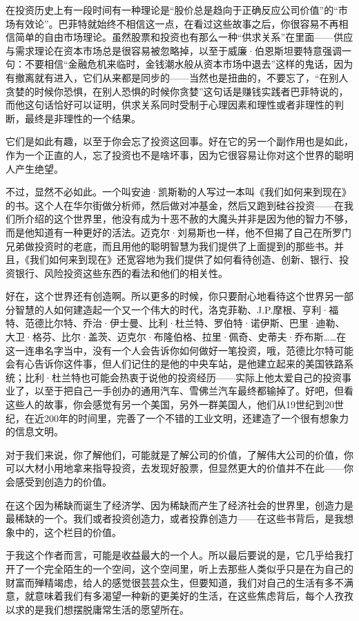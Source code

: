 在投资历史上有一段时间有一种理论是``股价总是趋向于正确反应公司价值''的``市场有效论''。巴菲特就始终不相信这一点，在看过这些故事之后，你很容易不再相信简单的自由市场理论。虽然股票和投资也有那么一种``供求关系''在里面------供应与需求理论在资本市场总是很容易被忽略掉，以至于威廉·伯恩斯坦要特意强调一句：不要相信``金融危机来临时，金钱潮水般从资本市场中退去''这样的鬼话，因为有撤离就有进入，它们从来都是同步的------当然也是扭曲的，不要忘了，``在别人贪婪的时候你恐惧，在别人恐惧的时候你贪婪''这句话是赚钱实践者巴菲特说的，而他这句话恰好可以证明，供求关系同时受制于心理因素和理性或者非理性的判断，最终是非理性的一个结果。

它们是如此有趣，以至于你会忘了投资这回事。好在它的另一个副作用也是如此，作为一个正直的人，忘了投资也不是啥坏事，因为它很容易让你对这个世界的聪明人产生绝望。

不过，显然不必如此。一个叫安迪·凯斯勒的人写过一本叫《我们如何来到现在》的书。这个人在华尔街做分析师，然后做对冲基金，然后又跑到硅谷投资------在我们所介绍的这个世界里，他没有成为十恶不赦的大魔头并非是因为他的智力不够，而是他知道有一种更好的活法。迈克尔·刘易斯也一样，他不但揭了自己在所罗门兄弟做投资时的老底，而且用他的聪明智慧为我们提供了上面提到的那些书。并且，《我们如何来到现在》还宽容地为我们提供了如何看待创造、创新、银行、投资银行、风险投资这些东西的看法和他们的相关性。

好在，这个世界还有创造啊。所以更多的时候，你只要耐心地看待这个世界另一部分智慧的人如何建造起一个又一个伟大的时代，洛克菲勒、J.P.摩根、亨利·福特、范德比尔特、乔治·伊士曼、比利·杜兰特、罗伯特·诺伊斯、巴里·迪勒、大卫·格芬、比尔·盖茨、迈克尔·布隆伯格、拉里·佩奇、史蒂夫·乔布斯\ldots\ldots 在这一连串名字当中，没有一个人会告诉你如何做好一笔投资，哦，范德比尔特可能会有心告诉你这件事，但人们记住的是他的中央车站，是他建立起来的美国铁路系统；比利·杜兰特也可能会热衷于说他的投资经历------实际上他太爱自己的投资事业了，以至于把自己一手创办的通用汽车、雪佛兰汽车最终都输掉了。好吧，但看这些人的故事，你会感觉有另一个美国，另外一群美国人，他们从19世纪到20世纪，在近200年的时间里，完善了一个不错的工业文明，还建造了一个很有想象力的信息文明。

对于我们来说，你了解他们，可能就是了解公司的价值，了解伟大公司的价值，你可以大材小用地拿来指导投资，去发现好股票，但显然更大的价值并不在此------你会感受到创造力的价值。

在这个因为稀缺而诞生了经济学、因为稀缺而产生了经济社会的世界里，创造力是最稀缺的一个。我们或者投资创造力，或者投靠创造力------在这些书背后，是我想象中的，这个栏目的价值。

于我这个作者而言，可能是收益最大的一个人。所以最后要说的是，它几乎给我打开了一个完全陌生的一个空间，这个空间里，听上去那些人类似乎只是在为自己的财富而殚精竭虑，给人的感觉很芸芸众生，但要知道，我们对自己的生活有多不满意，就意味着我们有多渴望一种新的更美好的生活，在这些焦虑背后，每个人孜孜以求的是我们想摆脱庸常生活的愿望所在。
